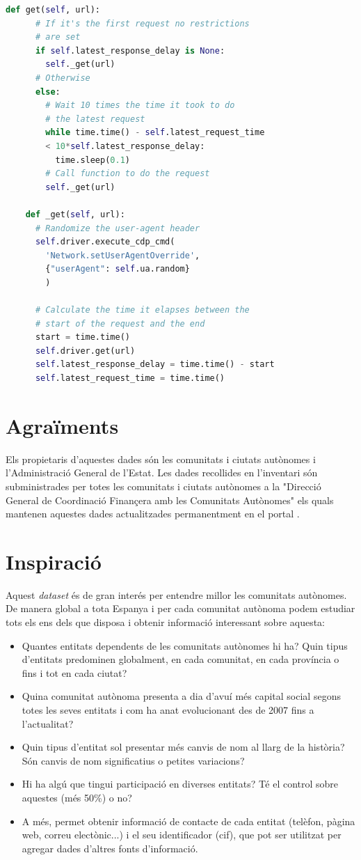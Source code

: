 \documentclass[12pt]{article}
\begin{document}
\noindent\begin{lstlisting}[language=Python]
    def get(self, url):
      # If it's the first request no restrictions 
      # are set
      if self.latest_response_delay is None:
        self._get(url)
      # Otherwise
      else:
        # Wait 10 times the time it took to do 
        # the latest request
        while time.time() - self.latest_request_time
        < 10*self.latest_response_delay:
          time.sleep(0.1)
        # Call function to do the request
        self._get(url)

    def _get(self, url):
      # Randomize the user-agent header
      self.driver.execute_cdp_cmd(
        'Network.setUserAgentOverride', 
        {"userAgent": self.ua.random}
        )

      # Calculate the time it elapses between the 
      # start of the request and the end
      start = time.time()
      self.driver.get(url)
      self.latest_response_delay = time.time() - start
      self.latest_request_time = time.time()
\end{lstlisting}




\section*{Agraïments}
Els propietaris d'aquestes dades són les comunitats i ciutats autònomes i l'Administració General de l'Estat. Les dades recollides en l'inventari són subministrades per totes les comunitats i ciutats autònomes a la "Direcció General de Coordinació Finançera amb les Comunitats Autònomes" els quals mantenen aquestes dades actualitzades permanentment en el portal \cite{PDFAjuda}.

\section*{Inspiració}
Aquest \textit{dataset} és de gran interés per entendre millor les comunitats autònomes. De manera global a tota Espanya i per cada comunitat autònoma podem estudiar tots els ens dels que disposa i obtenir informació interessant sobre aquesta:
\begin{itemize}
    \item Quantes entitats dependents de les comunitats autònomes hi ha? Quin tipus d'entitats predominen globalment, en cada comunitat, en cada província o fins i tot en cada ciutat?
    \item Quina comunitat autònoma presenta a dia d'avuí més capital social segons totes les seves entitats i com ha anat evolucionant des de 2007 fins a l'actualitat?
    \item Quin tipus d'entitat sol presentar més canvis de nom al llarg de la història? Són canvis de nom significatius o petites variacions?
    \item Hi ha algú que tingui participació en diverses entitats? Té el control sobre aquestes (més 50\%) o no?
    \item A més, permet obtenir informació de contacte de cada entitat (telèfon, pàgina web, correu electònic...) i el seu identificador (cif), que pot ser utilitzat per agregar dades d'altres fonts d'informació.
\end{itemize}
\end{document}
